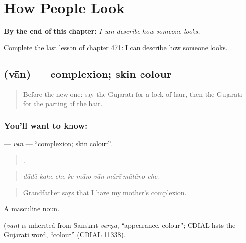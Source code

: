 
\chapter{How People Look}
\label{ch:gu-how-people-look}

\begin{chapteropening}
\textbf{By the end of this chapter:} \emph{I can describe how someone looks.}

Complete the last lesson of chapter 471: I can describe how someone looks.
\end{chapteropening}

\section[\texorpdfstring{\gu{વાન} (vān)}{વાન (vān)}]{ (vān) — complexion; skin colour}

\label{lesson:GU-C471-van}



\begin{quote}
Before the new one: say the Gujarati for a lock of hair, then the Gujarati for the parting of the hair.
\end{quote}

\subsection*{You'll want to know: }
\textbf{} — \emph{vān} — \textquotedblleft{}complexion; skin colour\textquotedblright{}.

\begin{quote}
        .
\end{quote}

\begin{quote}
\emph{dādā kahe che ke māro vān mārī mātāno che.}
\end{quote}

\begin{quote}
Grandfather says that I have my mother's complexion.
\end{quote}

A masculine noun.

\begin{cousinweb}
\textbf{} (\emph{vān}) is inherited from Sanskrit \emph{varṇa}, \textquotedblleft{}appearance, colour\textquotedblright{}; CDIAL lists the Gujarati word, \textquotedblleft{}colour\textquotedblright{} (CDIAL 11338).
\end{cousinweb}

